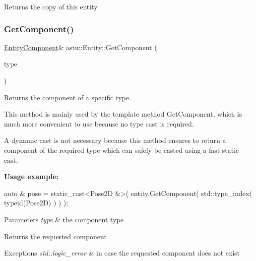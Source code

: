 \begin{DoxyReturn}{Returns}
the copy of this entity 
\end{DoxyReturn}
\mbox{\label{classastu_1_1Entity_a3d9bb583859f1a941fdaad76f5093323}} 
\subsubsection{\texorpdfstring{Get\+Component()}{GetComponent()}\hspace{0.1cm}{\footnotesize\ttfamily [1/4]}}
{\footnotesize\ttfamily \hyperlink{classastu_1_1EntityComponent}{Entity\+Component}\& astu\+::\+Entity\+::\+Get\+Component (\begin{DoxyParamCaption}\item[{const std\+::type\+\_\+index \&}]{type }\end{DoxyParamCaption})}

Returns the component of a specific type.

This method is mainly used by the template method {\ttfamily Get\+Component}, which is much more convenient to use because no type cast is required.

A dynamic cast is not necessary because this method ensures to return a component of the required type which can safely be casted using a fast static cast.

{\bfseries Usage example\+:} 
\begin{DoxyCode}
\textcolor{keyword}{auto} & pose = \textcolor{keyword}{static\_cast<}Pose2D &\textcolor{keyword}{>}( entity.GetComponent( std::type\_index( \textcolor{keyword}{typeid}(Pose2D) ) ) );
\end{DoxyCode}



\begin{DoxyParams}{Parameters}
{\em type} & the component type \\
\hline
\end{DoxyParams}
\begin{DoxyReturn}{Returns}
the requested component 
\end{DoxyReturn}

\begin{DoxyExceptions}{Exceptions}
{\em std\+::logic\+\_\+error} & in case the requested component does not exist \\
\hline
\end{DoxyExceptions}
\mbox{\label{classastu_1_1Entity_affe49f8c35d5b067f06803e27243189a}} 
